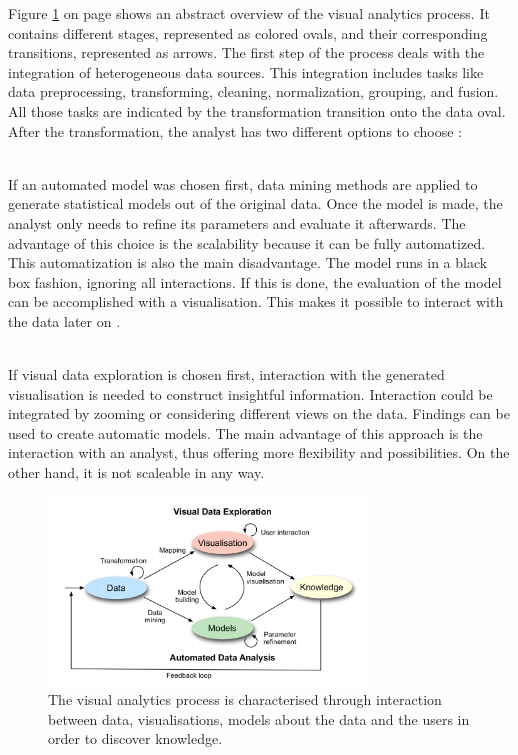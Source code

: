 Figure \ref{fig:va-process} on page \pageref{fig:va-process} shows an abstract overview of the visual analytics process. It contains different stages, represented as colored ovals, and their corresponding transitions, represented as arrows. The first step of the process deals with the integration of heterogeneous data sources. This integration includes tasks like data preprocessing, transforming, cleaning, normalization, grouping, and fusion. All those tasks are indicated by the transformation transition onto the data oval. After the transformation, the analyst has two different options to choose :

\begin{enumerate}
 \hfill \\
If an automated model was chosen first, data mining methods are applied to generate statistical models out of the original data. Once the model is made, the analyst only needs to refine its parameters and evaluate it afterwards. The advantage of this choice is the scalability because it can be fully automatized. This automatization is also the main disadvantage. The model runs in a black box fashion, ignoring all interactions. If this is done, the evaluation of the model can be accomplished with a visualisation. This makes it possible to interact with the data later on .

 \hfill \\
If visual data exploration is chosen first, interaction with the generated visualisation is needed to construct insightful information. Interaction could be integrated by zooming or considering different views on the data. Findings can be used to create automatic models. The main advantage of this approach is the interaction with an analyst, thus offering more flexibility and possibilities. On the other hand, it is not scaleable in any way.
\end{enumerate}

\begin{figure}[!htb]
\centering
\includegraphics[height=5cm,keepaspectratio]{images/va/va-process.png}
\caption[
    The visual analytics process is characterised through interaction between data, visualisations, models about the data and the users in order to discover knowledge .
]{The visual analytics process is characterised through interaction between data, visualisations, models about the data and the users in order to discover knowledge.}
\label{fig:va-process}
\end{figure}

